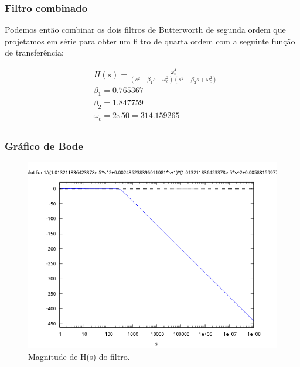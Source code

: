 \documentclass[12pt,twoside, a4paper, twocolumn]{article}
\begin{document}
\subsubsection{Filtro combinado}


Podemos então combinar os dois filtros de Butterworth de segunda ordem que projetamos em série para obter um filtro de quarta ordem com a seguinte função de transferência:


\begin{equation}
    \begin{aligned}
         & H(s) = \frac{\omega_c^4}{\left( s^2 + \beta_1 s + \omega_c^2 \right) \left( s^2 + \beta_2 s + \omega_c^2 \right)} \\
         & \beta_1 = 0.765367                                                                                                \\
         & \beta_2 = 1.847759                                                                                                \\
         & \omega_c = 2 \pi 50 = 314.159265                                                                                  \\
    \end{aligned}
\end{equation}




\subsubsection{Gráfico de Bode}


\begin{figure}[h]
    \centering
    \includegraphics[width=1\columnwidth]{images/bodegain.png}
    \caption{Magnitude de H(s) do filtro.}
\end{figure}
\end{document}
